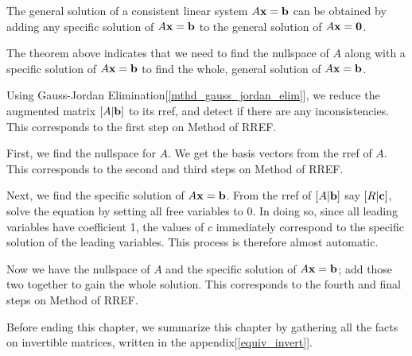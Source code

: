 \documentclass{report}
\begin{document}
			\begin{thm}
				The general solution of a consistent linear system $A\bf{x}=\bf{b}$ can be obtained by adding any specific solution of $A\bf{x}=\bf{b}$ to the general solution of $A\bf{x}=\bf{0}$.
			\end{thm}
			
			The theorem above indicates that we need to find the nullspace of $A$ along with a specific solution of $A\bf{x}=\bf{b}$ to find the whole, general solution of $A\bf{x}=\bf{b}$.
			
			Using Gauss-Jordan Elimination[\ref{mthd_gauss_jordan_elim}], we reduce the augmented matrix $\left[A|\bf{b}\right]$ to its rref, and detect if there are any inconsistencies. This corresponds to the first step on Method of RREF.
			
			First, we find the nullspace for $A$. We get the basis vectors from the rref of $A$. This corresponds to the second and third steps on Method of RREF.
			
			Next, we find the specific solution of $A\bf{x}=\bf{b}$. From the rref of $\left[A|\bf{b}\right]$ say $\left[R|\bf{c}\right]$, solve the equation by setting all free variables to 0. In doing so, since all leading variables have coefficient 1, the values of $c$ immediately correspond to the specific solution of the leading variables. This process is therefore almost automatic.
			
			Now we have the nullspace of $A$ and the specific solution of $A\bf{x}=\bf{b}$; add those two together to gain the whole solution. This corresponds to the fourth and final steps on Method of RREF.
		
	
	Before ending this chapter, we summarize this chapter by gathering all the facts on invertible matrices, written in the appendix[\ref{equiv_invert}].
\end{document}
